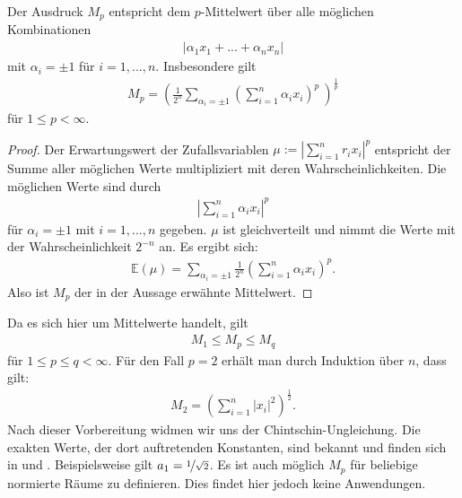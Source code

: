 \begin{lem}
	Der Ausdruck $ M_p  $ entspricht dem $ p $-Mittelwert über alle möglichen Kombinationen
	\begin{align*}
		| \alpha_1 x_1 + ... + \alpha_n x_n |
	\end{align*}
	mit $ \alpha_i = \pm 1$ für $  i = 1, ..., n $. Insbesondere gilt
	\begin{align*}
		M_p = 
		\left(
		\frac{1}{2^n}
		\sum \limits_{\alpha_i = \pm 1}
		\left(\sum \limits_{i = 1}^n \alpha_i x_i\right)^p \
		\right)^\frac{1}{p}
	\end{align*}
	für $ 1 \leq p < \infty $. 
\end{lem}
\begin{proof}
	Der Erwartungswert der Zufallsvariablen $  \mu:= \left|\sum_{i = 1}^n r_i x_i \right|^p $ entspricht der Summe aller möglichen Werte multipliziert mit deren Wahrscheinlichkeiten.
	Die möglichen Werte sind durch
	\begin{align*}
		\left|\sum_{i = 1}^n \alpha_i x_i \right|^p
	\end{align*}
	für $ \alpha_i = \pm 1$ mit $ i = 1,...,n $ gegeben. 
	\newpage
	 $ \mu $ ist gleichverteilt und nimmt die Werte mit der Wahrscheinlichkeit $ 2^{-n} $ an.
	Es ergibt sich:
	\begin{align*}
		\mathbb{E}(\mu)
		=
		\sum \limits_{\alpha_i = \pm 1} \frac{1}{2^n}
		\left(\sum \limits_{i = 1}^n \alpha_i x_i\right)^p. 
	\end{align*}
	Also ist $ M_p $ der in der Aussage erwähnte Mittelwert.
\end{proof}

Da es sich hier um Mittelwerte handelt, gilt
\begin{align*}
	M_1 \leq M_p \leq M_q
\end{align*}
für $ 1 \leq p \leq q < \infty $.
Für den Fall $ p = 2 $ erhält man durch Induktion über $ n $, dass gilt:
\begin{align*}
	M_2 = \left( \sum \limits_{i = 1}^n | x_i |^2\right)^\frac{1}{2}.
\end{align*}
Nach dieser Vorbereitung widmen wir uns der Chintschin-Ungleichung.
Die exakten Werte, der dort auftretenden Konstanten, sind bekannt und finden sich in \cite{Szarek1976} und \cite{Young1976}.
Beispielsweise gilt $ a_1 = \nicefrac{1}{\sqrt{2}} $.
Es ist auch möglich $ M_p  $ für beliebige normierte Räume zu definieren. Dies findet hier jedoch keine Anwendungen.


